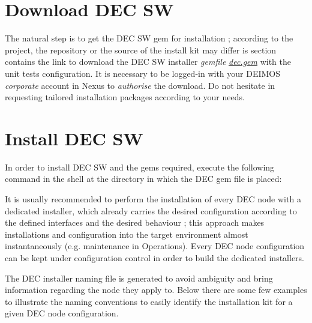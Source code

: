 \documentclass[dec_sum_main.tex]{subfiles}
\begin{document}
 \newline

 \newline



\section{Download DEC SW}
The natural step is to get the DEC SW gem for installation ; according to the project, the repository or the source of the install kit may differ
is section contains the link to download the DEC SW installer \textit{gemfile} \href{https://nexus3.elecnor-deimos.com/repository/NAOS-IVV/dec/dec-1.0.38a_naos-test_gsc4eo@nl2-u-moc-srv-01.gem}{\textit{dec.gem}} with the unit tests configuration. It is necessary to be logged-in with your DEIMOS \textit{corporate} account in Nexus to \textit{authorise} the download. Do not hesitate in requesting tailored installation packages according to your needs.

\section{Install DEC SW}

In order to install DEC SW and the gems required, execute the following command in the shell at the directory in which the DEC gem file is placed:
\par
{} \newline
\par

\par
\par
\noindent
It is usually recommended to perform the installation of every DEC node with a dedicated installer, which already carries the desired configuration according to the defined interfaces and the desired behaviour ; this approach makes installations and configuration into the target environment almost instantaneously (e.g. maintenance in Operations). Every DEC node configuration can be kept under configuration control in order to build the dedicated installers.\newline

\noindent
The DEC installer naming file is generated to avoid ambiguity and bring information regarding the node they apply to. Below there are some few examples to illustrate the naming conventions to easily identify the installation kit for a given DEC node configuration.\newline
\par
\end{document}
